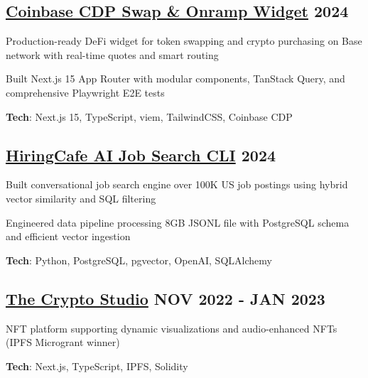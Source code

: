 \documentclass[letter,10pt]{article}
\begin{document}
\subsection{{ \href{https://github.com/Suhel-Kap/coinbase-swap-widget}{Coinbase CDP Swap \& Onramp Widget} \hfill 2024}}
\begin{zitemize}
  \item Production-ready DeFi widget for token swapping and crypto purchasing on Base network with real-time quotes and smart routing
  \item Built Next.js 15 App Router with modular components, TanStack Query, and comprehensive Playwright E2E tests
  \item \textbf{Tech}: Next.js 15, TypeScript, viem, TailwindCSS, Coinbase CDP
\end{zitemize}

\subsection{{ \href{https://github.com/Suhel-Kap/hiringcafe-dataset-job-search}{HiringCafe AI Job Search CLI} \hfill 2024}}
\begin{zitemize}
  \item Built conversational job search engine over 100K US job postings using hybrid vector similarity and SQL filtering
  \item Engineered data pipeline processing 8GB JSONL file with PostgreSQL schema and efficient vector ingestion
  \item \textbf{Tech}: Python, PostgreSQL, pgvector, OpenAI, SQLAlchemy
\end{zitemize}

\subsection{{ \href{https://github.com/Suhel-Kap/the-crypto-studio}{The Crypto Studio} \hfill NOV 2022 - JAN 2023}}
\begin{zitemize}
  \item NFT platform supporting dynamic visualizations and audio-enhanced NFTs (IPFS Microgrant winner)
  \item \textbf{Tech}: Next.js, TypeScript, IPFS, Solidity
\end{zitemize}
\end{document}

